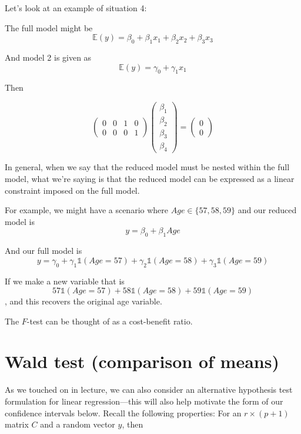 \documentclass[
  letterpaper,
  DIV=11,
  numbers=noendperiod]{scrreport}
\begin{document}
Let's look at an example of situation 4:

The full model might be
\[\mathbb E(y) = \beta_0 + \beta_1 x_1 + \beta_2 x_2 + \beta_3 x_3\]

And model 2 is given as \[\mathbb E(y) = \gamma_0 + \gamma_1 x_1\]

Then

\[\left( \begin{array}{cccc} 0 & 0 & 1 & 0 \\ 0 & 0 & 0 & 1 \end{array} \right) \left( \begin{array}{c} \beta_1 \\ \beta_2 \\ \beta_3 \\ \beta_4 \end{array} \right) = \left( \begin{array}{c} 0 \\ 0 \end{array} \right)\]

In general, when we say that the reduced model must be nested within the
full model, what we're saying is that the reduced model can be expressed
as a linear constraint imposed on the full model.

For example, we might have a scenario where \(Age \in \{ 57, 58, 59 \}\)
and our reduced model is \[y = \beta_0 + \beta_1 Age\]

And our full model is
\[y = \gamma_0 + \gamma_1 \mathbb 1(Age = 57) + \gamma_2 \mathbb 1(Age = 58) + \gamma_3 \mathbb 1 (Age = 59)\]

If we make a new variable that is
\[57 \mathbb 1(Age = 57) + 58 \mathbb 1(Age = 58) + 59 \mathbb 1 (Age = 59)\],
and this recovers the original age variable.

The \(F\)-test can be thought of as a cost-benefit ratio.

\hypertarget{wald-test-comparison-of-means}{%
\section{Wald test (comparison of
means)}\label{wald-test-comparison-of-means}}

As we touched on in lecture, we can also consider an alternative
hypothesis test formulation for linear regression---this will also help
motivate the form of our confidence intervals below. Recall the
following properties: For an \(r \times (p+1)\) matrix \(C\) and a
random vector \(y\), then
\end{document}
